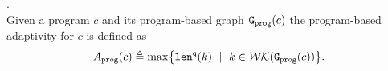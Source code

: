 %
%
%
\begin{defn}
.
\label{def:prog_adapt}
\\
{
Given a program ${c}$ and its program-based graph 
$\mathtt{{G_{prog}}}({c})$
%
the program-based adaptivity for $c$ is 
defined as%
\[
\progA({c})
\triangleq \max
\left\{ \qlen(k) \ \mid \  k \in \walks(\progG(c))\right \}.
\]
}
\end{defn}


% 
% 
